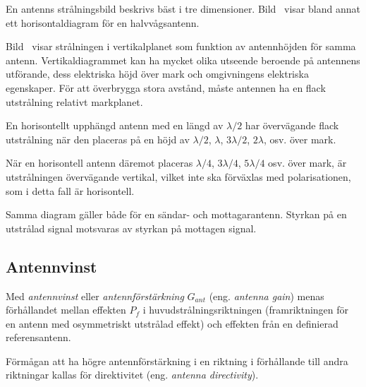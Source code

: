 
En antenns strålningsbild beskrivs bäst i tre dimensioner.
Bild~ visar bland annat ett horisontaldiagram för en
halvvågsantenn.

Bild~ visar strålningen i vertikalplanet som funktion av
antennhöjden för samma antenn.
Vertikaldiagrammet kan ha mycket olika utseende beroende på antennens utförande,
dess elektriska höjd över mark och omgivningens elektriska egenskaper.
För att överbrygga stora avstånd, måste antennen ha en flack utstrålning
relativt markplanet.

En horisontellt upphängd antenn med en längd av \(\lambda/2\) har övervägande
flack utstrålning när den placeras på en höjd av \(\lambda/2\), \(\lambda\),
\(3\lambda/2\), \(2\lambda\), osv. över mark.

När en horisontell antenn däremot placeras \(\lambda/4\), \(3\lambda/4\),
\(5\lambda/4\) osv. över mark, är utstrålningen övervägande vertikal, vilket
inte ska förväxlas med polarisationen, som i detta fall är horisontell.

Samma diagram gäller både för en sändar- och mottagarantenn.
Styrkan på en utstrålad signal motsvaras av styrkan på mottagen signal.

\subsection{Antennvinst}
\label{antenner_antennvins}

Med \emph{antennvinst} eller \emph{antennförstärkning} \(G_{ant}\) (eng.
\emph{antenna gain}) menas förhållandet mellan effekten \(P_f\) i
huvudstrålningsriktningen (framriktningen för en antenn med osymmetriskt
utstrålad effekt) och effekten från en definierad referensantenn.

Förmågan att ha högre antennförstärkning i en riktning i förhållande till andra
riktningar kallas för direktivitet (eng. \emph{antenna directivity}).

